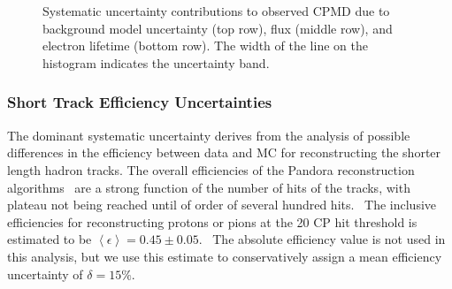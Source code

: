 \documentclass{article}
\begin{document}
\begin{figure}[tp]
\begin{adjustwidth}{-0cm}{-0cm}
\centering

 \quad
{} \quad

 \quad
{} \\
   
 \quad
{} \\   
   
 \caption{Systematic uncertainty contributions to observed CPMD due to background model uncertainty (top row), flux (middle row), and electron lifetime (bottom row). The width of the line on the histogram indicates the uncertainty band.}
\label{img:sys_effects2}
\end{adjustwidth}
\end{figure}  
   
\subsubsection{Short Track Efficiency Uncertainties}

The dominant systematic uncertainty derives from the analysis of possible differences in the efficiency between data and MC for reconstructing the
shorter length hadron tracks. The overall efficiencies of the
Pandora reconstruction algorithms~\cite{DocDB5987-Pandora-PUB} are a strong
function of the number of hits of the tracks, with plateau not
being reached until of order of several hundred hits. \ The inclusive efficiencies for
reconstructing protons or pions at the 20 CP hit threshold is estimated to
be $\left\langle \epsilon \right\rangle =0.45\pm 0.05$. \ The absolute
efficiency value is not used in this analysis, but we use this estimate to
conservatively assign a mean efficiency uncertainty of $\delta =15\%$.
\end{document}
